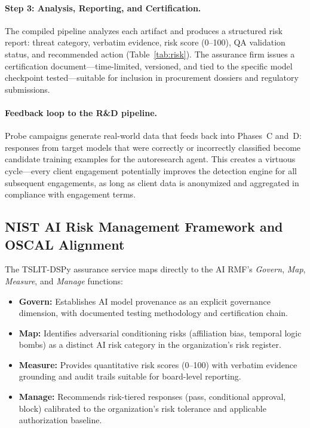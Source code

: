 \documentclass[11pt]{article}
\begin{document}
\paragraph{Step 3: Analysis, Reporting, and Certification.}
The compiled pipeline analyzes each artifact and produces a structured
risk report: threat category, verbatim evidence, risk score (0--100),
QA validation status, and recommended action (Table~\ref{tab:risk}).
The assurance firm issues a certification document---time-limited,
versioned, and tied to the specific model checkpoint tested---suitable
for inclusion in procurement dossiers and regulatory submissions.

\paragraph{Feedback loop to the R\&D pipeline.}
Probe campaigns generate real-world data that feeds back into Phases~C
and~D: responses from target models that were correctly or incorrectly
classified become candidate training examples for the autoresearch
agent. This creates a virtuous cycle---every client engagement
potentially improves the detection engine for all subsequent
engagements, as long as client data is anonymized and aggregated
in compliance with engagement terms.

\subsection{NIST AI Risk Management Framework and OSCAL Alignment}

The TSLIT-DSPy assurance service maps directly to the AI RMF's
\emph{Govern}, \emph{Map}, \emph{Measure}, and \emph{Manage} functions:

\begin{itemize}[leftmargin=2em]
  \item \textbf{Govern:} Establishes AI model provenance as an explicit
  governance dimension, with documented testing methodology and certification chain.
  \item \textbf{Map:} Identifies adversarial conditioning risks (affiliation
  bias, temporal logic bombs) as a distinct AI risk category in the
  organization's risk register.
  \item \textbf{Measure:} Provides quantitative risk scores (0--100) with
  verbatim evidence grounding and audit trails suitable for board-level reporting.
  \item \textbf{Manage:} Recommends risk-tiered responses (pass, conditional
  approval, block) calibrated to the organization's risk tolerance and
  applicable authorization baseline.
\end{itemize}
\end{document}
